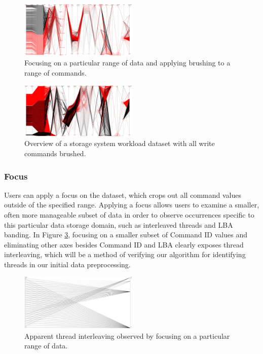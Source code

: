 \documentclass[journal]{vgtc}                %
\begin{document}
\begin{figure}[h!]
 \centering
 \includegraphics[width=0.5\textwidth]{images/brush_focus5.eps}
 \caption[Applying brushing to a range of commands in the dataset.]{Focusing on a particular range of data and applying brushing to a range of commands.}
 \label{fig:brush}
\end{figure}

\begin{figure}[h!]
 \centering
 \includegraphics[width=0.5\textwidth]{images/demo.eps}
 \caption[Storage system workload dataset with write commands brushed.]{Overview of a storage system workload dataset with all write commands brushed.}
 \label{fig:brush2}
\end{figure}

\subsubsection{Focus}
Users can apply a focus on the dataset, which crops out all command values outside of the specified range. Applying a focus allows users to examine a smaller, often more manageable subset of data in order to observe occurrences specific to this particular data storage domain, such as interleaved threads and LBA banding. In Figure \ref{fig:focus_interleaving}, focusing on a smaller subset of Command ID values and eliminating other axes besides Command ID and LBA clearly exposes thread interleaving, which will be a method of verifying our algorithm for identifying threads in our initial data preprocessing.

\begin{figure}[h!]
 \centering
 \includegraphics[width=0.5\textwidth]{images/interleaved_bw.eps}
 \caption[Thread interleaving observed by focusing on a range of data.]{Apparent thread interleaving observed by focusing on a particular range of data.}
 \label{fig:focus_interleaving}
\end{figure}
\end{document}
